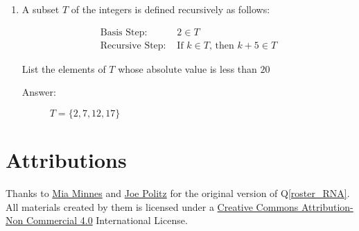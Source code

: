 \documentclass[12pt, oneside]{article}
\begin{document}
\begin{enumerate}
\item A subset $T$ of the integers is defined recursively as follows:

\[
\begin{array}{ll}
\textrm{Basis Step: } & 2 \in T \\
\textrm{Recursive Step: } & \textrm{If } k \in T\textrm{, then } k + 5 \in T
\end{array}
\]

List the elements of $T$ whose absolute value is less than $20$
\begin{description}
    \item[Answer:] $T=\{2, 7, 12, 17\}$
\end{description}
\end{enumerate}

\section*{Attributions}

Thanks to \href{http://cseweb.ucsd.edu/~minnes/}{Mia Minnes} and \href{https://jpolitz.github.io/}{Joe Politz} for the original version of Q\ref{roster_RNA}. All materials created by them is licensed under a \href{http://creativecommons.org/licenses/by-nc/4.0/}{Creative Commons Attribution-Non Commercial 4.0} International License.
\end{document}
